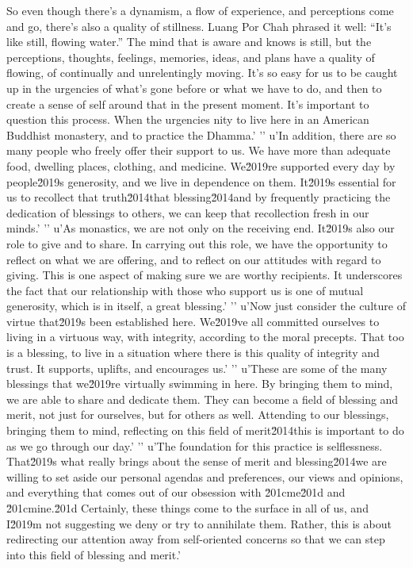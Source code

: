 So even though there's a dynamism, a flow of experience, and 
perceptions come and go, there's also a quality of stillness. Luang Por 
Chah phrased it well: ``It's like still, flowing water.'' The mind that 
is aware and knows is still, but the perceptions, thoughts, feelings, 
memories, ideas, and plans have a quality of flowing, of continually 
and unrelentingly moving. It's so easy for us to be caught up in the 
urgencies of what's gone before or what we have to do, and then to 
create a sense of self around that in the present moment. It's 
important to question this process. When the urgencies nity to live here in an American Buddhist monastery, and to practice the Dhamma.'
'\n'
u'In addition, there are so many people who freely offer their support to us. We have more than adequate food, dwelling places, clothing, and medicine. We\u2019re supported every day by people\u2019s generosity, and we live in dependence on them. It\u2019s essential for us to recollect that truth\u2014that blessing\u2014and by frequently practicing the dedication of blessings to others, we can keep that recollection fresh in our minds.'
'\n'
u'As monastics, we are not only on the receiving end. It\u2019s also our role to give and to share. In carrying out this role, we have the opportunity to reflect on what we are offering, and to reflect on our attitudes with regard to giving. This is one aspect of making sure we are worthy recipients. It underscores the fact that our relationship with those who support us is one of mutual generosity, which is in itself, a great blessing.'
'\n'
u'Now just consider the culture of virtue that\u2019s been established here. We\u2019ve all committed ourselves to living in a virtuous way, with integrity, according to the moral precepts. That too is a blessing, to live in a situation where there is this quality of integrity and trust. It supports, uplifts, and encourages us.'
'\n'
u'These are some of the many blessings that we\u2019re virtually swimming in here. By bringing them to mind, we are able to share and dedicate them. They can become a field of blessing and merit, not just for ourselves, but for others as well. Attending to our blessings, bringing them to mind, reflecting on this field of merit\u2014this is important to do as we go through our day.'
'\n'
u'The foundation for this practice is selflessness. That\u2019s what really brings about the sense of merit and blessing\u2014we are willing to set aside our personal agendas and preferences, our views and opinions, and everything that comes out of our obsession with \u201cme\u201d and \u201cmine.\u201d Certainly, these things come to the surface in all of us, and I\u2019m not suggesting we deny or try to annihilate them. Rather, this is about redirecting our attention away from self-oriented concerns so that we can step into this field of blessing and merit.'
